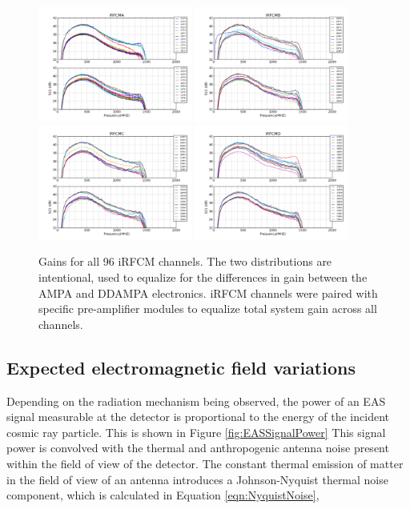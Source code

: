 \begin{figure}
\centering
	\includegraphics[width=0.45\textwidth]{figures/IRFCMA}
	\includegraphics[width=0.45\textwidth]{figures/IRFCMB}	
	\includegraphics[width=0.45\textwidth]{figures/IRFCMC}
	\includegraphics[width=0.45\textwidth]{figures/IRFCMD}	
	\caption{Gains for all 96 iRFCM channels.  The two distributions are intentional, used to equalize for the differences in gain between the AMPA and DDAMPA electronics. iRFCM channels were paired with specific pre-amplifier modules to equalize total system gain across all channels.}
	\label{fig:IRFCMgain}
\end{figure}		

	\subsection{Expected electromagnetic field variations}
		Depending on the radiation mechanism being observed, the power of an EAS signal measurable at the detector is proportional to the energy of the incident cosmic ray particle\cite{EnergyEstimator}.  This is shown in Figure \ref{fig:EASSignalPower} This signal power is convolved with the thermal and anthropogenic antenna noise present within the field of view of the detector.  The constant thermal emission of matter in the field of view of an antenna introduces a Johnson-Nyquist thermal noise component, which is calculated in Equation \ref{eqn:NyquistNoise},

